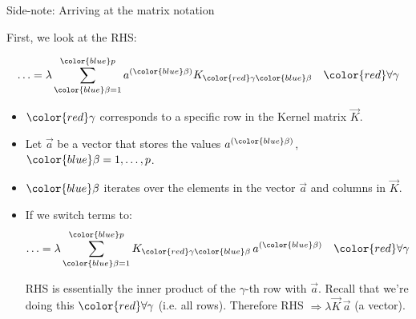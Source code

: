 \begin{frame}{Side-note: Arriving at the matrix notation}



First, we look at the RHS:

\svspace{-5mm}

\begin{equation}
 \ldots = \lambda 
 \sum^{{\color{blue}p}}_{\color{blue}\beta=1} a^{({\color{blue}\beta})} 
K_{{\color{red}\gamma} {\color{blue}\beta}} \quad {\color{red}\forall \gamma}
\end{equation}

\begin{itemize}
\item ${\color{red}\gamma}$ corresponds to a specific row in the Kernel matrix $\vec K$.
\item Let $\vec a$ be a vector that stores the values $a^{({\color{blue}\beta})}$, ${\color{blue}\beta=1,\ldots,p}$.
\item ${\color{blue}\beta}$ iterates over the elements in the vector $\vec a$ and columns in $\vec K$.
\item If we switch terms to:
\svspace{-3mm}
\begin{equation}
 \ldots = \lambda 
 \sum^{{\color{blue}p}}_{\color{blue}\beta=1}  
K_{{\color{red}\gamma} {\color{blue}\beta}} \, a^{({\color{blue}\beta})} \quad {\color{red}\forall \gamma}
\label{eq:rearrangerhs}
\end{equation}

RHS is essentially the inner product of the $\gamma$-th row with $\vec a$.
Recall that we're doing this ${\color{red}\forall \gamma}$ (i.e. all rows). Therefore RHS $\Rightarrow \lambda \vec K \, \vec a$ (a vector). 


\end{itemize}

\end{frame}

